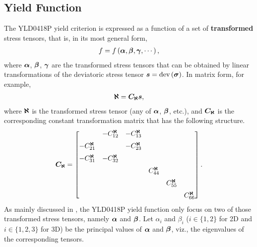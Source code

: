\subsection{Yield Function}\label{sec:yld0418p_yield_function}
The YLD0418P yield criterion is expressed as a function of a set of \textbf{transformed} stress tensors, that is, in its most general form,
\begin{gather}
    f=f\left(\bm{\alpha},\bm{\beta},\bm{\gamma},\cdots\right),
\end{gather}
where $\bm{\alpha}$, $\bm{\beta}$, $\bm{\gamma}$ are the transformed stress tensors that can be obtained by linear transformations of the deviatoric stress tensor $\bm{s}=\text{dev}\left(\bm{\sigma}\right)$.
In matrix form, for example,
\begin{gather}
    \bm{\aleph}=\bm{C_\aleph}\bm{s},
\end{gather}
where $\bm{\aleph}$ is the transformed stress tensor (any of $\bm{\alpha}$, $\bm{\beta}$, etc.), and $\bm{C_\aleph}$ is the corresponding constant transformation matrix that has the following structure.
\begin{gather}
    \bm{C_\aleph}=
    \begin{bmatrix}
                              & -C^{\bm{\aleph}}_{12} & -C^{\bm{\aleph}}_{13} &                      &                      &                      \\[2mm]
        -C^{\bm{\aleph}}_{21} &                       & -C^{\bm{\aleph}}_{23} &                      &                      &                      \\[2mm]
        -C^{\bm{\aleph}}_{31} & -C^{\bm{\aleph}}_{32} &                       &                      &                      &                      \\[2mm]
                              &                       &                       & C^{\bm{\aleph}}_{44} &                      &                      \\[2mm]
                              &                       &                       &                      & C^{\bm{\aleph}}_{55} &                      \\[2mm]
                              &                       &                       &                      &                      & C^{\bm{\aleph}}_{66}
    \end{bmatrix}.
\end{gather}
As mainly discussed in \cite{Barlat2005}, the YLD0418P yield function only focus on two of those transformed stress tensors, namely $\bm{\alpha}$ and $\bm{\beta}$.
Let $\alpha_i$ and $\beta_i$ ($i\in\{1,2\}$ for 2D and $i\in\{1,2,3\}$ for 3D) be the principal values of $\bm{\alpha}$ and $\bm{\beta}$, viz., the eigenvalues of the corresponding tensors.
